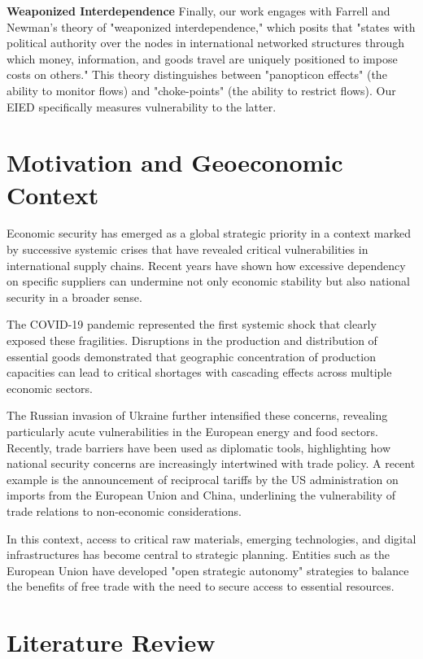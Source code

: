 \documentclass[final,1p,times,authoryear]{elsarticle}
\begin{document}
\textbf{Weaponized Interdependence}
Finally, our work engages with Farrell and Newman's \citeyear{farrell2019weaponized} theory of "weaponized interdependence," which posits that "states with political authority over the nodes in international networked structures through which money, information, and goods travel are uniquely positioned to impose costs on others." This theory distinguishes between "panopticon effects" (the ability to monitor flows) and "choke-points" (the ability to restrict flows). Our EIED specifically measures vulnerability to the latter.

\section{Motivation and Geoeconomic Context}

Economic security has emerged as a global strategic priority in a context marked by successive systemic crises that have revealed critical vulnerabilities in international supply chains. Recent years have shown how excessive dependency on specific suppliers can undermine not only economic stability but also national security in a broader sense.

The COVID-19 pandemic represented the first systemic shock that clearly exposed these fragilities. Disruptions in the production and distribution of essential goods demonstrated that geographic concentration of production capacities can lead to critical shortages with cascading effects across multiple economic sectors.

The Russian invasion of Ukraine further intensified these concerns, revealing particularly acute vulnerabilities in the European energy and food sectors. Recently, trade barriers have been used as diplomatic tools, highlighting how national security concerns are increasingly intertwined with trade policy. A recent example is the announcement of reciprocal tariffs by the US administration on imports from the European Union and China, underlining the vulnerability of trade relations to non-economic considerations.

In this context, access to critical raw materials, emerging technologies, and digital infrastructures has become central to strategic planning. Entities such as the European Union have developed "open strategic autonomy" strategies to balance the benefits of free trade with the need to secure access to essential resources.

\section{Literature Review}
\end{document}
